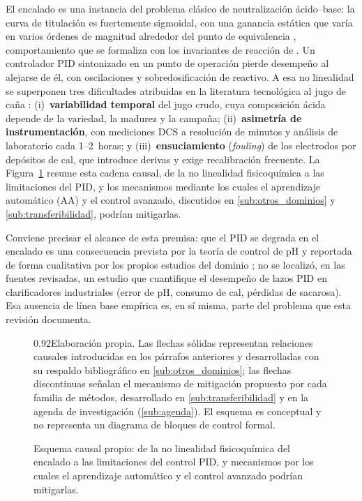 El encalado es una instancia del problema clásico de neutralización
ácido--base: la curva de titulación es fuertemente sigmoidal, con una
ganancia estática que varía en varios órdenes de magnitud alrededor del
punto de equivalencia \parencite{shinskey1996process}, comportamiento que
se formaliza con los invariantes de reacción de
\textcite{gustafsson1983dynamic}. Un controlador PID sintonizado en un
punto de operación pierde desempeño al alejarse de él, con oscilaciones
y sobredosificación de reactivo. A esa no linealidad se superponen tres
dificultades atribuidas en la literatura tecnológica al jugo de caña
\parencite{rein2007cane,garcia1989model}: (i)~\textbf{variabilidad
temporal} del jugo crudo, cuya composición ácida depende de la variedad,
la madurez y la campaña; (ii)~\textbf{asimetría de instrumentación}, con
mediciones DCS a resolución de minutos y análisis de laboratorio cada
1--2~horas; y (iii)~\textbf{ensuciamiento} (\textit{fouling}) de los
electrodos por depósitos de cal, que introduce derivas y exige
recalibración frecuente. La Figura~\ref{fig:causal} resume esta cadena
causal, de la no linealidad fisicoquímica a las limitaciones del PID, y los
mecanismos mediante los cuales el aprendizaje automático (AA) y el control
avanzado, discutidos en \ref{sub:otros_dominios} y
\ref{sub:transferibilidad}, podrían mitigarlas.

Conviene precisar el alcance de esta premisa: que el PID se degrada en el
encalado es una consecuencia prevista por la teoría de control de pH y
reportada de forma cualitativa por los propios estudios del dominio
\parencite{murugesan2020computeraided}; no se localizó, en las fuentes
revisadas, un estudio que cuantifique el desempeño de lazos PID en
clarificadores industriales (error de pH, consumo de cal, pérdidas de
sacarosa). Esa ausencia de línea base empírica es, en sí misma, parte del
problema que esta revisión documenta.

\nolinenumbers
\begin{figure}[H]
\centering
\captionsetup{width=0.92\textwidth}
\caption{Esquema causal propio: de la no linealidad fisicoquímica del
encalado a las limitaciones del control PID, y mecanismos por los cuales
el aprendizaje automático y el control avanzado podrían mitigarlas.}
\label{fig:causal}
\resizebox{\textwidth}{!}{}
\begin{Nota}[Nota]{0.92\textwidth}{Elaboración propia. Las flechas sólidas
representan relaciones causales introducidas en los párrafos anteriores y
desarrolladas con su respaldo bibliográfico en \ref{sub:otros_dominios};
las flechas discontinuas señalan el mecanismo de mitigación propuesto por
cada familia de métodos, desarrollado en \ref{sub:transferibilidad} y en
la agenda de investigación (\ref{sub:agenda}). El esquema es conceptual y
no representa un diagrama de bloques de control formal.}
\end{Nota}
\end{figure}
\linenumbers

